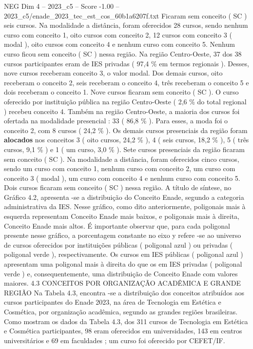 \begin{textsample}{NEG Dim 4 – 2023\_c5 – Score -1.00 – 2023\_c5/enade\_2023\_tec\_est\_cos\_60b1a6207f.txt}
Ficaram sem conceito ( SC ) seis cursos.
Na modalidade a distância, foram oferecidos 28 cursos, sendo nenhum curso com conceito 1, oito cursos com conceito 2, 12 cursos com conceito 3 ( modal ), oito cursos com conceito 4 e nenhum curso com conceito 5.
Nenhum curso ficou sem conceito ( SC ) nessa região.
Na região Centro-Oeste, 37 dos 38 cursos participantes eram de IES privadas ( 97,4 \% em termos regionais ).
Desses, nove cursos receberam conceito 3, o valor modal.
Dos demais cursos, oito receberam o conceito 2, seis receberam o conceito 4, três receberam o conceito 5 e dois receberam o conceito 1.
Nove cursos ficaram sem conceito ( SC ).
O curso oferecido por instituição pública na região Centro-Oeste ( 2,6 \% do total regional ) recebeu conceito 4.
Também na região Centro-Oeste, a maioria dos cursos foi ofertada na modalidade presencial : 33 ( 86,8 \% ).
Para esses, a moda foi o conceito 2, com 8 cursos ( 24,2 \% ).
Os demais cursos presenciais da região foram \textbf{alocados} nos conceitos 3 ( oito cursos, 24,2 \% ), 4 ( seis cursos, 18,2 \% ), 5 ( três cursos, 9,1 \% ) e 1 ( um curso, 3,0 \% ).
Sete cursos presenciais da região ficaram sem conceito ( SC ).
Na modalidade a distância, foram oferecidos cinco cursos, sendo um curso com conceito 1, nenhum curso com conceito 2, um curso com conceito 3 ( modal ), um curso com conceito 4 e nenhum curso com conceito 5.
Dois cursos ficaram sem conceito ( SC ) nessa região.
A título de síntese, no Gráfico 4.2, apresenta -se a distribuição do Conceito Enade, segundo a categoria administrativa da IES.
Nesse gráfico, como dito anteriormente, poligonais mais à esquerda representam Conceito Enade mais baixos, e poligonais mais à direita, Conceito Enade mais altos.
É importante observar que, para cada poligonal presente nesse gráfico, a porcentagem constante no eixo y refere -se ao universo de cursos oferecidos por instituições públicas ( poligonal azul ) ou privadas ( poligonal verde ), respectivamente.
Os cursos em IES públicas ( poligonal azul ) apresentam uma poligonal mais à direita do que os em IES privadas ( poligonal verde ) e, consequentemente, uma distribuição de Conceito Enade com valores maiores. 4.3 CONCEITOS POR ORGANIZAÇÃO ACADÊMICA E GRANDE REGIÃO Na Tabela 4.3, encontra -se a distribuição dos conceitos atribuídos aos cursos participantes do Enade 2023, na área de Tecnologia em Estética e Cosmética, por organização acadêmica, segundo as grandes regiões brasileiras.
Como mostram os dados da Tabela 4.3, dos 311 cursos de Tecnologia em Estética e Cosmética participantes, 98 eram oferecidos em universidades, 143 em centros universitários e 69 em faculdades ; um curso foi oferecido por CEFET/IF.

\end{textsample}
